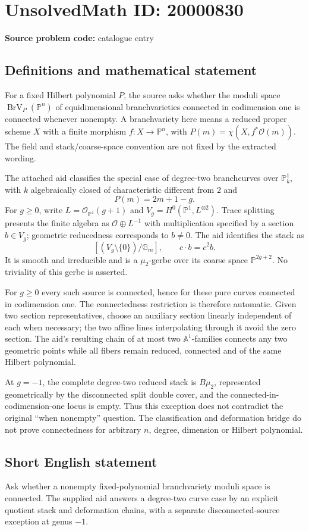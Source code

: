 \documentclass[11pt]{article}
\newcommand{\PP}{\mathbb{P}}
\begin{document}
\section*{UnsolvedMath ID: 20000830}
\textbf{Source problem code:} catalogue entry
\subsection{Definitions and mathematical statement}
For a fixed Hilbert polynomial $P$, the source asks whether the moduli space $\operatorname{BrV}_P(\PP^n)$ of equidimensional branchvarieties connected in codimension one is connected whenever nonempty. A branchvariety here means a reduced proper scheme $X$ with a finite morphism $f:X\to\PP^n$, with $P(m)=\chi(X,f^*\mathcal O(m))$. The field and stack/coarse-space convention are not fixed by the extracted wording.

The attached aid classifies the special case of degree-two branchcurves over $\PP^1_k$, with $k$ algebraically closed of characteristic different from $2$ and
\[
P(m)=2m+1-g.
\]
For $g\ge0$, write $L=\mathcal O_{\PP^1}(g+1)$ and $V_g=H^0(\PP^1,L^{\otimes2})$. Trace splitting presents the finite algebra as $\mathcal O\oplus L^{-1}$ with multiplication specified by a section $b\in V_g$; geometric reducedness corresponds to $b\ne0$. The aid identifies the stack as
\[
[(V_g\setminus\{0\})/\mathbb G_m],\qquad c\cdot b=c^2b.
\]
It is smooth and irreducible and is a $\mu_2$-gerbe over its coarse space $\PP^{2g+2}$. No triviality of this gerbe is asserted.

For $g\ge0$ every such source is connected, hence for these pure curves connected in codimension one. The connectedness restriction is therefore automatic. Given two section representatives, choose an auxiliary section linearly independent of each when necessary; the two affine lines interpolating through it avoid the zero section. The aid's resulting chain of at most two $\mathbb A^1$-families connects any two geometric points while all fibers remain reduced, connected and of the same Hilbert polynomial.

At $g=-1$, the complete degree-two reduced stack is $B\mu_2$, represented geometrically by the disconnected split double cover, and the connected-in-codimension-one locus is empty. Thus this exception does not contradict the original ``when nonempty'' question. The classification and deformation bridge do not prove connectedness for arbitrary $n$, degree, dimension or Hilbert polynomial.
\subsection{Short English statement}
Ask whether a nonempty fixed-polynomial branchvariety moduli space is connected. The supplied aid answers a degree-two curve case by an explicit quotient stack and deformation chains, with a separate disconnected-source exception at genus $-1$.
\end{document}
